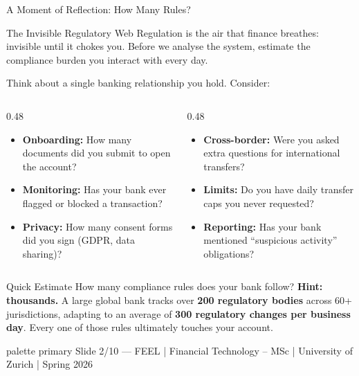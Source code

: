 \documentclass[aspectratio=169, 11pt]{beamer}
\newcommand{\bottomnote}[1]{%
  \vfill
  \begin{beamercolorbox}[wd=\textwidth,ht=2ex,dp=1ex]{palette primary}
    \tiny\hspace{1em}#1
  \end{beamercolorbox}}
\begin{document}
\begin{frame}{A Moment of Reflection: How Many Rules?}

\vspace{0.2em}
\begin{block}{The Invisible Regulatory Web}
\small Regulation is the air that finance breathes: invisible until it chokes you.
Before we analyse the system, estimate the compliance burden you interact with every day.
\end{block}

\vspace{0.3em}
\small Think about a single banking relationship you hold. Consider:

\vspace{0.15em}
\begin{columns}[T]
\begin{column}{0.48\textwidth}
\begin{itemize}\small
  \item[\textcolor{mlteal}{\textbullet}] \textbf{Onboarding:} How many documents did you submit to open the account?
  \item[\textcolor{mlteal}{\textbullet}] \textbf{Monitoring:} Has your bank ever flagged or blocked a transaction?
  \item[\textcolor{mlteal}{\textbullet}] \textbf{Privacy:} How many consent forms did you sign (GDPR, data sharing)?
\end{itemize}
\end{column}
\begin{column}{0.48\textwidth}
\begin{itemize}\small
  \item[\textcolor{mlcyan}{\textbullet}] \textbf{Cross-border:} Were you asked extra questions for international transfers?
  \item[\textcolor{mlcyan}{\textbullet}] \textbf{Limits:} Do you have daily transfer caps you never requested?
  \item[\textcolor{mlcyan}{\textbullet}] \textbf{Reporting:} Has your bank mentioned ``suspicious activity'' obligations?
\end{itemize}
\end{column}
\end{columns}

\vspace{0.3em}
\begin{exampleblock}{Quick Estimate}
\small How many compliance rules does your bank follow? \textbf{Hint: thousands.}
A large global bank tracks over \textbf{200 regulatory bodies} across 60+ jurisdictions, adapting to an average of \textbf{300 regulatory changes per business day}. Every one of those rules ultimately touches your account.
\end{exampleblock}

\bottomnote{Slide 2/10 --- FEEL | Financial Technology -- MSc | University of Zurich | Spring 2026}
\end{frame}
\end{document}

